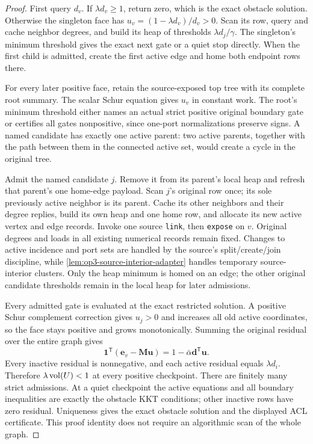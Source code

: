 \begin{proof}
First query $d_v$. If $\lambda d_v\geq1$, return zero, which is the exact
obstacle solution. Otherwise the singleton face has
$u_v=(1-\lambda d_v)/d_v>0$. Scan its row, query and cache neighbor degrees,
and build its heap of thresholds $\lambda d_j/\gamma$. The singleton's
minimum threshold gives the exact next gate or a quiet stop directly.
When the first child is admitted, create the first active edge and home
both endpoint rows there.

For every later positive face, retain the source-exposed top tree with its
complete root summary. The scalar Schur equation gives $u_v$ in constant
work. The root's minimum threshold either names an actual strict positive
original boundary gate or certifies all gates nonpositive, since one-port
normalizations preserve signs. A named candidate has exactly one active
parent: two active parents, together with the path between them in the
connected active set, would create a cycle in the original tree.

Admit the named candidate $j$. Remove it from its parent's local heap and
refresh that parent's one home-edge payload. Scan $j$'s original row once;
its sole previously active neighbor is its parent. Cache its other
neighbors and their degree replies, build its own heap and one home row,
and allocate its new active vertex and edge records. Invoke one source
\texttt{link}, then \texttt{expose} on $v$. Original degrees and loads in all
existing numerical records remain fixed. Changes to active incidence and
port sets are handled by the source's split/create/join discipline, while
\cref{lem:op3-source-interior-adapter} handles temporary source-interior
clusters. Only the heap minimum is homed on an edge; the other original
candidate thresholds remain in the local heap for later admissions.

Every admitted gate is evaluated at the exact restricted solution. A
positive Schur complement correction gives $u_j>0$ and increases all old
active coordinates, so the face stays positive and grows monotonically.
Summing the original residual over the entire graph gives
\[
 \boldsymbol1^{\mathsf T}
 (\boldsymbol e_v-\boldsymbol M\boldsymbol u)
 =1-\bar\alpha\boldsymbol d^{\mathsf T}\boldsymbol u.
\]
Every inactive residual is nonnegative, and each active residual equals
$\lambda d_i$. Therefore $\lambda\operatorname{vol}(U)<1$ at every positive checkpoint.
There are finitely many strict admissions. At a quiet checkpoint the active
equations and all boundary inequalities are exactly the obstacle KKT
conditions; other inactive rows have zero residual. Uniqueness gives the
exact obstacle solution and the displayed ACL certificate. This proof
identity does not require an algorithmic scan of the whole graph.


\end{proof}
